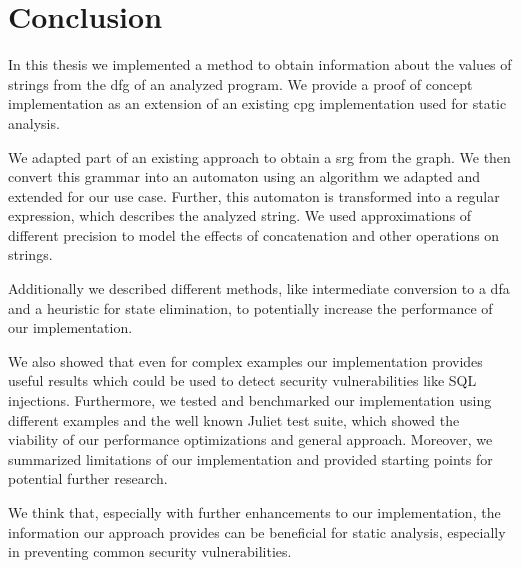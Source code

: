 \chapter{Conclusion}\label{chapter:Conclusion}

In this thesis we implemented a method to obtain information about the values of strings from the \acl{dfg} of an analyzed program. We provide a proof of concept implementation as an extension of an existing \acl{cpg} implementation used for static analysis.

We adapted part of an existing approach to obtain a \acl{srg} from the graph. We then convert this grammar into an automaton using an algorithm we adapted and extended for our use case.
Further, this automaton is transformed into a regular expression, which describes the analyzed string. We used approximations of different precision to model the effects of concatenation and other operations on strings.

Additionally we described different methods, like intermediate conversion to a \ac{dfa} and a heuristic for state elimination, to potentially increase the performance of our implementation.

We also showed that even for complex examples our implementation provides useful results which could be used to detect security vulnerabilities like SQL injections.
Furthermore, we tested and benchmarked our implementation using different examples and the well known Juliet test suite, which showed the viability of our performance optimizations and general approach.
Moreover, we summarized limitations of our implementation and provided starting points for potential further research.

We think that, especially with further enhancements to our implementation, the information our approach provides can be beneficial for static analysis, especially in preventing common security vulnerabilities.

\begin{comment}	
Summarize your main contributions and observations. Further research directions?

$\leq 1$ page
content...
\end{comment}